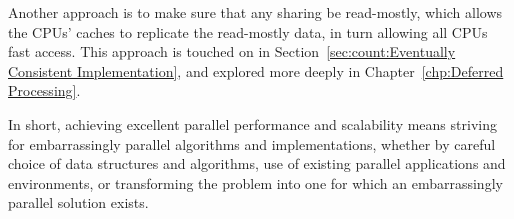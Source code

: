 Another approach is to make sure that any sharing be read-mostly, which
allows the CPUs' caches to replicate the read-mostly data, in turn
allowing all CPUs fast access.
This approach is touched on in
Section~\ref{sec:count:Eventually Consistent Implementation},
and explored more deeply in
Chapter~\ref{chp:Deferred Processing}.

In short, achieving excellent parallel performance and scalability means
striving for embarrassingly parallel algorithms and implementations,
whether by careful choice of data structures and algorithms, use of
existing parallel applications and environments, or transforming the
problem into one for which an embarrassingly parallel solution exists.

\QuickQuizEnd

